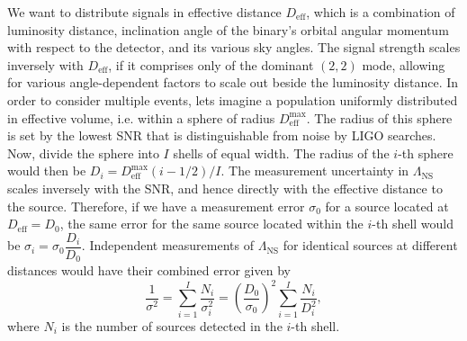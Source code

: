 \documentclass[aps,prd,amsmath,floats,floatfix, twocolumn,
superscriptaddress,nofootinbib,showpacs]{revtex4-1}
\newcommand{\D}{\mathrm{d}}
\newcommand{\lambdans}{\Lambda_\mathrm{NS}}
\newcommand{\deff}{D_\mathrm{eff}}
\begin{document}
We want to distribute signals in effective distance $\deff$, which is a combination of 
luminosity distance, inclination angle of the binary's orbital angular momentum
with respect to the detector, and its various sky angles. The signal strength 
scales inversely with $\deff$, if it comprises only of the dominant $(2,2)$ mode, allowing
for various angle-dependent factors to scale out beside the luminosity distance.
% 
In order to consider multiple events, lets imagine a population uniformly distributed
in effective volume, i.e. within a sphere of radius $\deff^\mathrm{max}$. The 
radius of this sphere is set by the lowest SNR that is distinguishable from noise
by LIGO searches. Now, divide the sphere into $I$ shells of equal width. The radius
of the $i$-th sphere would then be $D_i = \deff^\mathrm{max} (i - 1/2)/I$. The 
measurement uncertainty in $\lambdans$ scales inversely with the SNR, and hence
directly with the effective distance to the source. Therefore, if we have a 
measurement error $\sigma_0$ for a source located at $\deff = D_0$, the same error
for the same source located within the $i$-th shell would be 
$\sigma_i = \sigma_0 \dfrac{D_i}{D_0}.$
Independent measurements of $\lambdans$ for identical sources at different distances
would have their combined error given by
\begin{equation}\label{eq:1oversigma}
\frac{1}{\sigma^2} = \sum_{i=1}^I \frac{N_i}{\sigma_i^2} = \left(\frac{D_0}{\sigma_0}\right)^2 \sum_{i=1}^I\frac{N_i}{D_i^2},
\end{equation}
where $N_i$ is the number of sources detected in the $i$-th shell.
\end{document}
